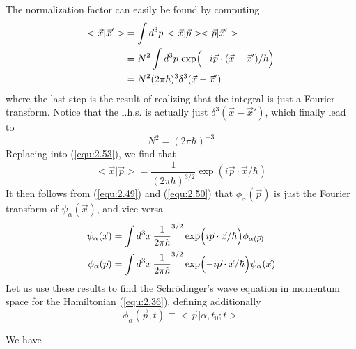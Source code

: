 The normalization factor can easily be found by computing
\begin{align}
  <\vec{x}|\vec{x}'> &= \int d^3 p \, <\vec{x}|\vec{p}>
  <\vec{p}|\vec{x}'>\nonumber\\
  &= N^2 \int d^3 p\, \exp\Bigl(-i \vec{p}\cdot
  (\vec{x}-\vec{x}')/\hbar\Bigr) \nonumber\\
  &=
  N^2 (2\pi \hbar)^3 \delta^3(\vec{x}-\vec{x}')
  \label{equ:2.54}
\end{align}
where the last step is the result of realizing that the
integral is just a Fourier transform. Notice that the l.h.s.
is actually just $\delta^3(\vec{x}-\vec{x}')$, which finally
lead to
\begin{equation}
  N^2 = (2\pi\hbar)^{-3}
  \label{equ:2.55}
\end{equation}
Replacing into (\ref{equ:2.53}), we find that
\begin{equation}
  <\vec{x}|\vec{p}> = \frac{1}{(2\pi\hbar)^{3/2}} \exp(i
  \vec{p}\cdot \vec{x}/\hbar)
  \label{equ:2.56}
\end{equation}
It then follows from (\ref{equ:2.49}) and (\ref{equ:2.50}) that
$\phi_{\alpha}(\vec{p})$ is just the Fourier transform of
$\psi_{\alpha}(\vec{x})$, and vice versa
\begin{align}
  \psi_{\alpha}(\vec{x}) &= \int d^3x \,
  \frac{1}{2\pi\hbar}^{3/2}
  \exp\Bigl(i\vec{p}\cdot\vec{x}/\hbar\Bigr)
  \phi_{\alpha(\vec{p})}\\
  \phi_{\alpha}(\vec{p}) &= \int d^3x \,
  \frac{1}{2\pi\hbar}^{3/2}
  \exp\Bigl(-i\vec{p}\cdot\vec{x}/\hbar\Bigr)
  \psi_{\alpha}(\vec{x})
\end{align}
Let us use these results to find the Schrödinger's wave
equation in momentum space for the Hamiltonian
(\ref{equ:2.36}), defining additionally
\begin{equation}
  \phi_{\alpha}(\vec{p},t) \equiv <\vec{p}|\alpha,t_0;t>
  \label{equ:2.58}
\end{equation}

We have

